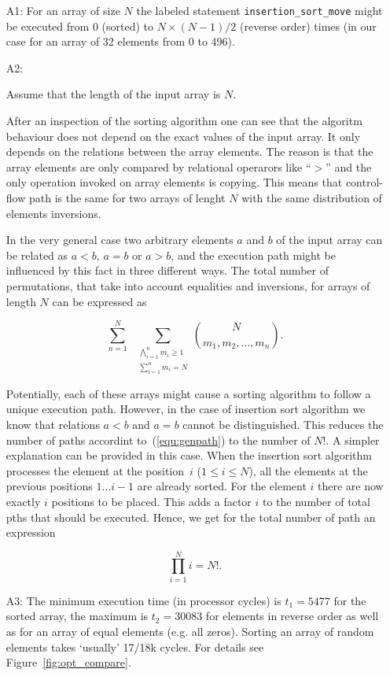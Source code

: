 \documentclass[12pt,a4paper,titlepage,oneside]{article}
\begin{document}
\begin{itemize}
\item[A1:]
For an array of size $N$ the labeled statement
\texttt{insertion\_sort\_move} might be executed from $0$ (sorted) to
$N\times(N-1)/2$ (reverse order) times (in our case for an array of 32 
elements from 0 to 496). 

\item[A2:] 

  Assume that the length of the input array is $N$.

  After an inspection of the sorting algorithm one can see that the
  algoritm behaviour does not depend on the exact values of the input
  array.
  It only depends on the relations between the array elements.
  The reason is that the array elements are only compared by
  relational operarors like ``$>$'' and the only operation invoked on
  array elements is copying.
  This means that control-flow path is the same for two arrays of
  lenght $N$ with the same distribution of elements inversions.

  In the very general case two arbitrary elements $a$ and $b$ of the
  input array can be related as $a<b$, $a=b$ or $a>b$, and the
  execution path might be influenced by this fact in three different
  ways.
  The total number of permutations, that take into account equalities
  and inversions, for arrays of length $N$ can be expressed as

  \begin{equation}
	\sum_{n=1}^N \ \ \sum_{\substack{
	  \bigwedge_{i=1}^n m_i \geq 1 
	  \\ \sum_{i=1}^n m_i = N}} \binom N {m_1, m_2, \ldots, m_n}.
	  \label{equ:genpath}
	\end{equation}

	Potentially, each of these arrays might cause a sorting algorithm
	to follow a unique execution path.
	However, in the case of insertion sort algorithm we know that
	relations $a<b$ and $a=b$ cannot be distinguished.
	This reduces the number of paths accordint to~(\ref{equ:genpath})
	to the number of $N!$.
	A simpler explanation can be provided in this case.
	When the insertion sort algorithm processes the element at the
	position~$i$ ($1 \leq i \leq N$), all the elements at the previous
	positions $1\ldots i-1$ are already sorted.
	For the element $i$ there are now exactly $i$ positions to be
	placed.
	This adds a factor $i$ to the number of total pths that should be
	executed.
	Hence, we get for the total number of path an expression

	$$
	  \prod_{i=1}^N i = N!.
	$$



           
\item[A3:] 
The minimum execution time (in processor cycles) is $t_1 = 5477$
for the sorted array, the maximum is $t_2 = 30083$ for elements in
reverse order as well as for an array of equal elements (e.g. all
zeros). Sorting an array of random elements takes `usually' 17/18k cycles.
For details see Figure~\ref{fig:opt_compare}.

\end{itemize}
\end{document}
